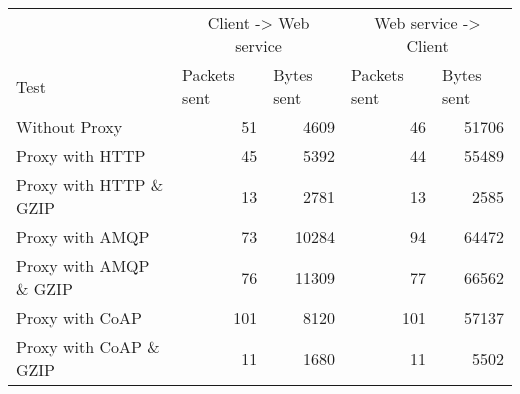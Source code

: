 \begin{tabular}{lrrrr}
\hline
\multicolumn{1}{l}{}                  & \multicolumn{2}{c}{Client -> Web service}                           & \multicolumn{2}{c}{Web service -> Client}                           \\
\multicolumn{1}{l}{Test} & \multicolumn{1}{l}{Packets sent} & \multicolumn{1}{l}{Bytes sent} & \multicolumn{1}{l}{Packets sent} & \multicolumn{1}{l}{Bytes sent} \\ \hline
Without Proxy                   & 51             & 4609           & 46             & 51706          \\
Proxy with HTTP                 & 45             & 5392           & 44             & 55489          \\
Proxy with HTTP \& GZIP         & 13             & 2781           & 13             & 2585           \\
Proxy with AMQP                 & 73             & 10284          & 94             & 64472          \\
Proxy with AMQP \& GZIP         & 76             & 11309          & 77             & 66562          \\
Proxy with CoAP                 & 101            & 8120           & 101            & 57137          \\
Proxy with CoAP \& GZIP         & 11             & 1680           & 11             & 5502           \\
\end{tabular}